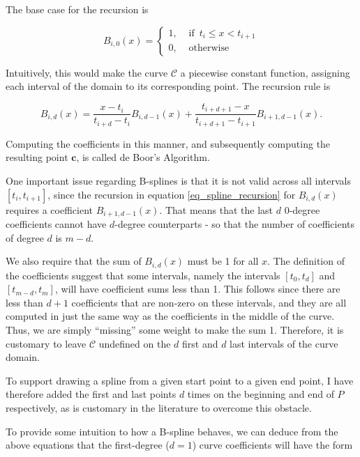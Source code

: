 \documentclass[english]{article}
\begin{document}
The base case for the recursion is

\begin{equation}
B_{i,0}(x) = \begin{cases}
  1, &\text{ if } \, t_i \leq x < t_{i + 1} \\
  0, &\text{ otherwise }
\end{cases}
\end{equation}

Intuitively, this would make the curve $\mathcal{C}$ a piecewise constant function, assigning each interval of the domain to its corresponding point. The recursion rule is

\begin{equation} \label{eq_spline_recursion}
B_{i,d}(x) = \dfrac{x - t_i}{t_{i + d} - t_i}B_{i,d - 1}(x) + \dfrac{t_{i + d + 1} - x}{t_{i + d + 1} - t_{i + 1}}B_{i + 1,d - 1}(x).
\end{equation}

Computing the coefficients in this manner, and subsequently computing the resulting point $\mathbf{c}$, is called de Boor's Algorithm.

One important issue regarding B-splines is that it is not valid across all intervals $[t_i, t_{i + 1}]$, since the recursion in equation \ref{eq_spline_recursion} for $B_{i,d}(x)$ requires a coefficient $B_{i + 1, d - 1}(x)$. That means that the last $d$ 0-degree coefficients cannot have $d$-degree counterparts - so that the number of coefficients of degree $d$ is $m - d$.

We also require that the sum of $B_{i,d}(x)$ must be 1 for all $x$. The definition of the coefficients suggest that some intervals, namely the intervals $[t_0, t_d]$ and $[t_{m-d},t_{m}]$, will have coefficient sums less than 1. This follows since there are less than $d + 1$ coefficients that are non-zero on these intervals, and they are all computed in just the same way as the coefficients in the middle of the curve. Thus, we are simply ``missing'' some weight to make the sum 1. Therefore, it is customary to leave $\mathcal{C}$ undefined on the $d$ first and $d$ last intervals of the curve domain.

To support drawing a spline from a given start point to a given end point, I have therefore added the first and last points $d$ times on the beginning and end of $P$ respectively, as is customary in the literature to overcome this obstacle.

To provide some intuition to how a B-spline behaves, we can deduce from the above equations that the first-degree ($d = 1$) curve coefficients will have the form
\end{document}
